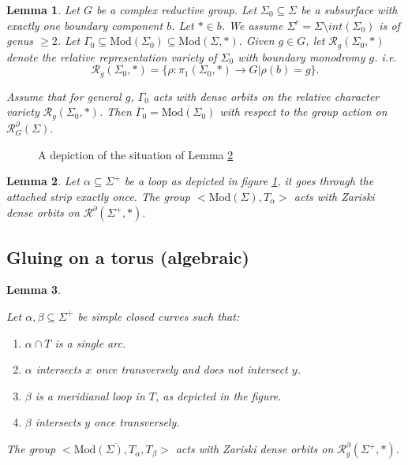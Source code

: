 \documentclass[10pt,a4paper]{amsart}
\newtheorem{lemma}{Lemma}
\newcommand{\Mod}{\textrm{Mod}}
\newcommand{\Rc}{\mathcal{R}}
\begin{document}
\begin{lemma}\label{changeofclosurealg}
    Let $G$ be a complex reductive group.
    Let $\Sigma_0 \subseteq \Sigma$ be a subsurface with exactly one boundary component $b$. Let $* \in b$. We assume $\Sigma^c = \Sigma \setminus int( \Sigma_0)$ is of genus $\ge 2$.
Let $\Gamma _0 \subseteq \Mod(\Sigma_0) \subseteq \Mod(\Sigma,*).$ Given $g \in G$, let  $\Rc_g(\Sigma_0, *)$ denote the relative representation variety of $\Sigma_0$ with boundary monodromy $g$. i.e. $$\Rc_g(\Sigma_0, *) = \{\rho : \pi_1(\Sigma_0,*) \to G | \rho(b) =g\}.$$

Assume that for general $g$, $\Gamma_0$ acts with dense orbits on the relative character variety $\Rc_g(\Sigma_0, *)$. Then $\overline\Gamma_0 = \overline{\Mod(\Sigma_0)}$ with respect to the group action on $\Rc_G^{\partial}(\Sigma).$
\end{lemma}

     \begin{figure}
         \centering
         
         \caption{A depiction of the situation of Lemma \ref{indsamebound}}
         \label{fig:samebound}
     \end{figure}

\begin{lemma}\label{indsamebound}
    Let $\alpha \subseteq \Sigma^+$ be a loop  as depicted in figure \ref{fig:samebound}, it goes through the attached strip exactly once.
The group $<\Mod(\Sigma), T_{\alpha}>$ acts with Zariski dense orbits on $\Rc^{\partial}(\Sigma^+, *).$
\end{lemma}

\subsection{Gluing on a torus (algebraic)}\label{gluetor}

\begin{lemma}\label{indtor}

    Let $\alpha, \beta \subseteq \Sigma^+$ be simple closed curves such that:
    \begin{enumerate}
        \item $\alpha\cap T $ is a single arc.
        \item $\alpha$ intersects $x$ once transversely and does not intersect $y$.
        \item $\beta$ is a meridianal loop in $T$, as depicted in the figure.
        \item $\beta $ intersects $y$ once transversely.
    \end{enumerate}
    The group $ \overline{<\Mod(\Sigma) , T_{\alpha} , T_{\beta}>}$ acts with Zariski dense orbits on $\Rc^{\partial}_g (\Sigma^+,*).$
\end{lemma}
\end{document}
